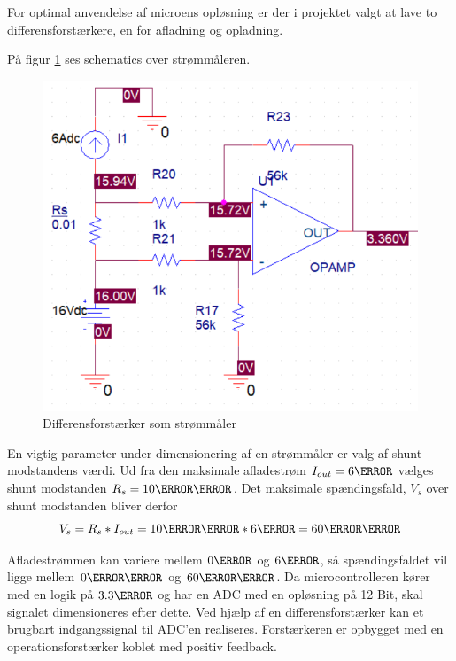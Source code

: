 For optimal anvendelse af microens opløsning er der i projektet valgt at lave to differensforstærkere, en for afladning og opladning.



På figur \ref{fig:current_sense} ses schematics over strømmåleren.
\begin{figure}[h]
	\centering
	\includegraphics[width=15cm]{billeder/current_sense.png}
	\caption{Differensforstærker som strømmåler}
	\label{fig:current_sense}
\end{figure}

En vigtig parameter under dimensionering af en strømmåler er valg af shunt modstandens værdi. Ud fra den maksimale afladestrøm $I_{out} = 6\ampere$ vælges shunt modstanden $R_{s} = 10\milli\ohm$. Det maksimale spændingsfald, $V_{s}$ over shunt modstanden bliver derfor
\begin {equation} 
V_{s} = R_{s} * I_{out} = 10\milli\ohm * 6\ampere = 60\milli\volt
\end {equation}

Afladestrømmen kan variere mellem $0\ampere$ og $6\ampere$, så spændingsfaldet vil ligge mellem $0\milli\volt$ og $60\milli\volt$. Da microcontrolleren kører med en logik på $3.3\volt$ og har en ADC med en opløsning på 12 Bit, skal signalet dimensioneres efter dette. Ved hjælp af en differensforstærker kan et brugbart indgangssignal til ADC'en realiseres. Forstærkeren er opbygget med en operationsforstærker koblet med positiv feedback.
\\

